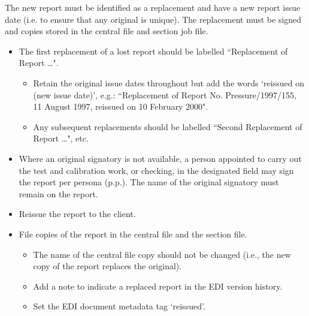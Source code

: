 The new report must be identified as a replacement and have a new report issue date (i.e. to ensure that any original is unique). The replacement must be signed and copies stored in the central file and section job file. 
\begin{itemize}
\item The first replacement of a lost report should be labelled ``Replacement of Report \ldots". 
\begin{itemize}
\item Retain the original issue dates throughout but add the words `reissued on (new issue date)', e.g.: ``Replacement of Report No. Pressure/1997/155, 11 August 1997, reissued on 10 February 2000".
\item Any subsequent replacements should be labelled ``Second Replacement of Report \ldots", etc.
\end{itemize}

\item Where an original signatory is not available, a person appointed to carry out the test and calibration work, or checking, in the designated field may sign the report per persona (p.p.).  The name of the original signatory must remain on the report.

\item Reissue the report to the client.

\item File copies of the report in the central file and the section file.
\begin{itemize}
\item The name of the central file copy should not be changed (i.e., the new copy of the report replaces the original). 
\item Add a note to indicate a replaced report in the EDI version history.
\item Set the EDI document metadata tag ‘reissued’.
\end{itemize}
\end{itemize}


